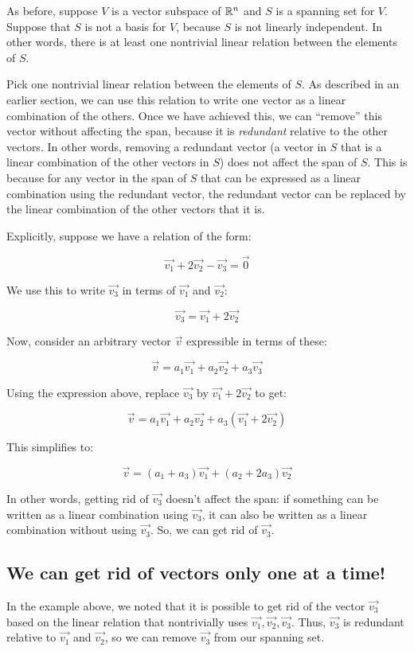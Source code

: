 \documentclass[10pt]{amsart}
\begin{document}
As before, suppose $V$ is a vector subspace of $\mathbb{R}^n$ and $S$ is a
spanning set for $V$. Suppose that $S$ is not a basis for $V$,
because $S$ is not linearly independent. In other words, there is at
least one nontrivial linear relation between the elements of $S$.

Pick one nontrivial linear relation between the elements of $S$. As
described in an earlier section, we can use this relation to write one
vector as a linear combination of the others. Once we have achieved
this, we can ``remove'' this vector without affecting the span,
because it is {\em redundant} relative to the other vectors. In other
words, removing a redundant vector (a vector in $S$ that is a linear
combination of the other vectors in $S$) does not affect the span of
$S$. This is because for any vector in the span of $S$ that can be
expressed as a linear combination using the redundant vector, the
redundant vector can be replaced by the linear combination of the
other vectors that it is.

Explicitly, suppose we have a relation of the form:

$$\vec{v_1} + 2\vec{v_2} - \vec{v_3} = \vec{0}$$

We use this to write $\vec{v_3}$ in terms of $\vec{v_1}$ and $\vec{v_2}$:

$$\vec{v_3} = \vec{v_1} + 2\vec{v_2}$$

Now, consider an arbitrary vector $\vec{v}$ expressible in terms of these:

$$\vec{v} = a_1\vec{v_1} + a_2\vec{v_2} + a_3\vec{v_3}$$

Using the expression above, replace $\vec{v_3}$ by $\vec{v_1} +
2\vec{v_2}$ to get:

$$\vec{v} = a_1\vec{v_1} + a_2\vec{v_2} + a_3(\vec{v_1} + 2\vec{v_2})$$

This simplifies to:

$$\vec{v} = (a_1 + a_3)\vec{v_1} + (a_2 + 2a_3)\vec{v_2}$$

In other words, getting rid of $\vec{v_3}$ doesn't affect the span: if
something can be written as a linear combination using $\vec{v_3}$, it
can also be written as a linear combination without using
$\vec{v_3}$. So, we can get rid of $\vec{v_3}$.

\subsection{We can get rid of vectors only one at a time!}

In the example above, we noted that it is possible to get rid of the
vector $\vec{v_3}$ based on the linear relation that nontrivially uses
$\vec{v_1},\vec{v_2},\vec{v_3}$. Thus, $\vec{v_3}$ is redundant
relative to $\vec{v_1}$ and $\vec{v_2}$, so we can remove $\vec{v_3}$
from our spanning set.
\end{document}

